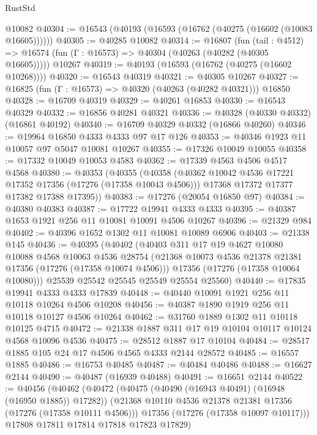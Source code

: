 \begin{lexlean}{RustStd}
\begin{coremodule}
    @10082
@40304 := @16543 (@40193 (@16593 (@16762 (@40275 (@16602 (@10083 @16605))))))
@40305 := @40285 @10082
@40314 := @16807
    (fun (tail : @4512) => @16574 (fun (Γ : @16573) => @40304 (@40263 (@40282 (@40305 @16605)))))
    @10267
@40319 := @40193 (@16593 (@16762 (@40275 (@16602 @10268))))
@40320 := @16543 @40319
@40321 := @40305 @10267
@40327 := @16825 (fun (Γ : @16573) => @40320 (@40263 (@40282 @40321))) @16850
@40328 := @16709 @40319
@40329 := @40261 @16853
@40330 := @16543 @40329
@40332 := @16856 @40281 @40321
@40336 := @40328 (@40330 @40332) (@16861 @40192)
@40340 := @16709 @40329 @40332 (@16866 @40260)
@40346 := @19964 @16850 @4333 @4333 @97 @17 @126
@40353 := @40346 @1923 @11 @10057 @97 @5047 @10081 @10267
@40355 := @17326 @10049 @10055
@40358 := @17332 @10049 @10053 @4583
@40362 := @17339 @4563 @4506 @4517 @4568
@40380 := @40353
    (@40355
      (@40358
        (@40362 @10042 @4536 @17221 @17352 @17356 (@17276 (@17358 @10043 @4506)))
        @17368
        @17372
        @17377
        @17382
        @17388
        @17395))
@40383 := @17276 (@20054 @16850 @97)
@40384 := @40380 @40383
@40387 := @17722 @19941 @4333 @4333
@40395 := @40387 @1653 @1921 @256 @11 @10081 @10091 @4506 @10267
@40396 := @21329 @984
@40402 := @40396 @1652 @1302 @11 @10081 @10089 @6906
@40403 := @21338 @145
@40436 := @40395
    (@40402
      (@40403
        @311
        @17
        @19
        @4627
        @10080
        @10088
        @4568
        @10063
        @4536
        @28754
        (@21368 @10073 @4536 @21378 @21381 @17356 (@17276 (@17358 @10074 @4506)))
        @17356
        (@17276 (@17358 @10064 @10080)))
      @25539
      @25542
      @25545
      @25549
      @25554
      @25560)
@40440 := @17835 @19941 @4333 @4333 @17839
@40448 := @40440 @10091 @1921 @256 @11 @10118 @10264 @4506 @10208
@40456 := @40387 @1890 @1919 @256 @11 @10118 @10127 @4506 @10264
@40462 := @31760 @1889 @1302 @11 @10118 @10125 @4715
@40472 := @21338 @1887 @311 @17 @19 @10104 @10117 @10124 @4568 @10096 @4536
@40475 := @28512 @1887 @17 @10104
@40484 := @28517 @1885 @105 @24 @17 @4506 @4565 @4333 @2144 @28572
@40485 := @16557 @1885
@40486 := @16753 @40485
@40487 := @40484 @40486
@40488 := @16627 @2144
@40490 := @40487 (@16939 @40488)
@40491 := @16651 @2144
@40522 := @40456
    (@40462
      (@40472
        (@40475 (@40490 (@16943 @40491) (@16948 (@16950 @1885)) @17282))
        (@21368 @10110 @4536 @21378 @21381 @17356 (@17276 (@17358 @10111 @4506)))
        @17356
        (@17276 (@17358 @10097 @10117)))
      @17808
      @17811
      @17814
      @17818
      @17823
      @17829)

\end{coremodule}
\end{lexlean}
